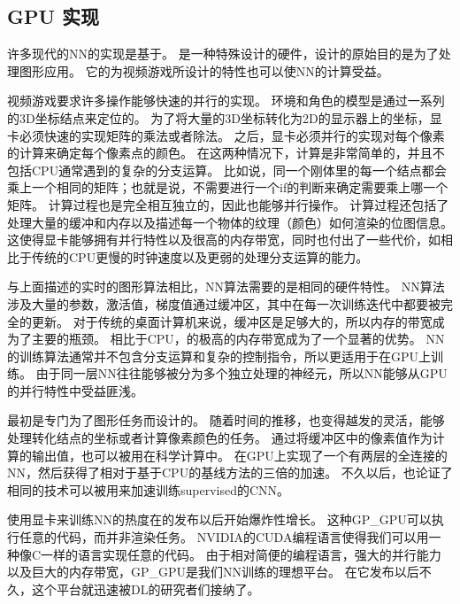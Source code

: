 \subsection{GPU 实现}
\label{sec:gpu_implementations}

许多现代的\gls{NN}的实现是基于。
是一种特殊设计的硬件，设计的原始目的是为了处理图形应用。
它的为视频游戏所设计的特性也可以使\gls{NN}的计算受益。

视频游戏要求许多操作能够快速的并行的实现。
环境和角色的模型是通过一系列的3D坐标结点来定位的。
为了将大量的3D坐标转化为2D的显示器上的坐标，显卡必须快速的实现矩阵的乘法或者除法。
之后，显卡必须并行的实现对每个像素的计算来确定每个像素点的颜色。
在这两种情况下，计算是非常简单的，并且不包括CPU通常遇到的复杂的分支运算。
比如说，同一个刚体里的每一个结点都会乘上一个相同的矩阵；也就是说，不需要进行一个if的判断来确定需要乘上哪一个矩阵。
计算过程也是完全相互独立的，因此也能够并行操作。
计算过程还包括了处理大量的缓冲和内存以及描述每一个物体的纹理（颜色）如何渲染的位图信息。
这使得显卡能够拥有并行特性以及很高的内存带宽，同时也付出了一些代价，如相比于传统的CPU更慢的时钟速度以及更弱的处理分支运算的能力。


与上面描述的实时的图形算法相比，\gls{NN}算法需要的是相同的硬件特性。
\gls{NN}算法涉及大量的参数，激活值，梯度值通过缓冲区，其中在每一次训练迭代中都要被完全的更新。
对于传统的桌面计算机来说，缓冲区是足够大的，所以内存的带宽成为了主要的瓶颈。
相比于CPU，的极高的内存带宽成为了一个显著的优势。
\gls{NN}的训练算法通常并不包含分支运算和复杂的控制指令，所以更适用于在GPU上训练。
由于同一层\gls{NN}往往能够被分为多个独立处理的神经元，所以\gls{NN}能够从GPU的并行特性中受益匪浅。


最初是专门为了图形任务而设计的。
随着时间的推移，也变得越发的灵活，能够处理转化结点的坐标或者计算像素颜色的任务。
通过将缓冲区中的像素值作为计算的输出值，也可以被用在科学计算中。
\citet{Steinkrau2005}在GPU上实现了一个有两层的全连接的\gls{NN}，然后获得了相对于基于CPU的基线方法的三倍的加速。
不久以后，\citet{chellapilla:inria-00112631}也论证了相同的技术可以被用来加速训练\gls{supervised}的\gls{CNN}。


使用显卡来训练\gls{NN}的热度在的发布以后开始爆炸性增长。
这种\gls{GP_GPU}可以执行任意的代码，而并非渲染任务。
NVIDIA的CUDA编程语言使得我们可以用一种像C一样的语言实现任意的代码。
由于相对简便的编程语言，强大的并行能力以及巨大的内存带宽，\gls{GP_GPU}是我们\gls{NN}训练的理想平台。
在它发布以后不久，这个平台就迅速被\gls{DL}的研究者们接纳了\citep{RainaICML09-small,Ciresan-2010}。




